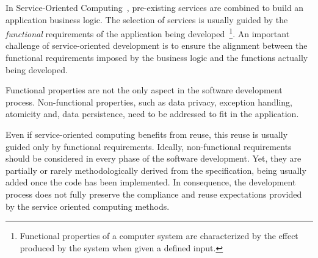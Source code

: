 




In Service-Oriented Computing~\cite{Papazoglou2007}, pre-existing services are
combined to build an application business logic.
The selection of services is usually guided by the \textit{functional} requirements of the application being developed~\cite{2,decastro1,PapazoglouH06}\footnote{Functional properties of a computer system are characterized by the effect produced by the system when given a defined input.}.
An important challenge of service-oriented development is  to ensure the alignment between the functional requirements imposed by the business logic and the functions actually being developed.

Functional properties are not the only  aspect in the software development process.
Non-functional properties, such as data privacy, exception handling, atomicity  and, data persistence, need to be addressed  to fit in the application.

Even if service-oriented computing benefits from reuse, this reuse is usually guided only by functional requirements.
%
Ideally, non-functional requirements should be considered in every phase of the software development.
Yet,  they are partially or rarely methodologically derived from the specification, being usually added once the code has been implemented. 
In consequence, the development process does not fully preserve the compliance and reuse expectations provided by the service oriented computing methods.


